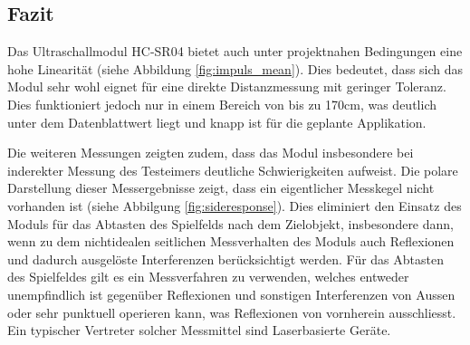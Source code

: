 \subsection{Fazit}
Das Ultraschallmodul HC-SR04 bietet auch unter projektnahen Bedingungen 
eine hohe Linearität (siehe Abbildung \ref{fig:impuls_mean}).
Dies bedeutet, dass sich das Modul sehr wohl eignet für eine direkte 
Distanzmessung mit geringer Toleranz. Dies funktioniert jedoch nur in einem
Bereich von bis zu 170cm, was deutlich unter dem Datenblattwert liegt und knapp
ist für die geplante Applikation.

Die weiteren Messungen zeigten zudem, dass das Modul insbesondere bei 
inderekter Messung des Testeimers deutliche Schwierigkeiten aufweist. Die 
polare Darstellung dieser Messergebnisse zeigt, dass ein eigentlicher 
Messkegel nicht vorhanden ist (siehe Abbilgung \ref{fig:sideresponse}).
Dies eliminiert den Einsatz des Moduls für das Abtasten des Spielfelds nach
dem Zielobjekt, insbesondere dann, wenn zu dem nichtidealen seitlichen
Messverhalten des Moduls auch Reflexionen und dadurch ausgelöste 
Interferenzen berücksichtigt werden. Für das Abtasten des Spielfeldes 
gilt es ein Messverfahren zu verwenden, welches entweder unempfindlich ist
gegenüber Reflexionen und sonstigen Interferenzen von Aussen oder sehr
punktuell operieren kann, was Reflexionen von vornherein ausschliesst.
Ein typischer Vertreter solcher Messmittel sind Laserbasierte Geräte.
